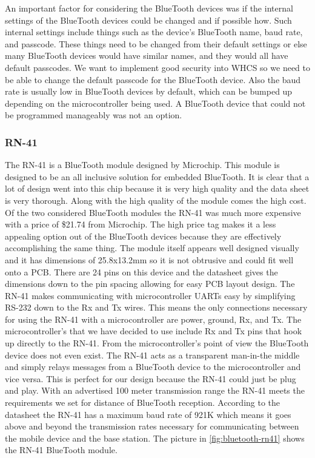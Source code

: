 An important factor for considering the BlueTooth devices was if the internal
settings of the BlueTooth devices could be changed and if possible how. Such
internal settings include things such as the device{}'s BlueTooth name, baud
rate, and passcode. These things need to be changed from their default settings
or else many BlueTooth devices would have similar names, and they would all
have default passcodes. We want to implement good security into WHCS so we need
to be able to change the default passcode for the BlueTooth device. Also the
baud rate is usually low in BlueTooth devices by default, which can be bumped
up depending on the microcontroller being used. A BlueTooth device that could
not be programmed manageably was not an option.

\subsubsection{RN-41}
The RN{}-41 is a BlueTooth module designed by Microchip. This module is
designed to be an all inclusive solution for embedded BlueTooth. It is clear
that a lot of design went into this chip because it is very high quality and
the data sheet is very thorough. Along with the high quality of the module
comes the high cost. Of the two considered BlueTooth modules the RN{}-41 was
much more expensive with a price of \$21.74 from Microchip. The high price tag
makes it a less appealing option out of the BlueTooth devices because they are
effectively accomplishing the same thing. The module itself appears well
designed visually and it has dimensions of 25.8x13.2mm so it is not obtrusive
and could fit well onto a PCB. There are 24 pins on this device and the
datasheet gives the dimensions down to the pin spacing allowing for easy PCB
layout design. The RN{}-41 makes communicating with microcontroller UARTs easy
by simplifying RS{}-232 down to the Rx and Tx wires. This means the only
connections necessary for using the RN{}-41 with a microcontroller are power,
ground, Rx, and Tx. The microcontroller{}'s that we have decided to use include
Rx and Tx pins that hook up directly to the RN{}-41. From the
microcontroller{}'s point of view the BlueTooth device does not even exist. The
RN{}-41 acts as a transparent man{}-in{}-the middle and simply relays messages
from a BlueTooth device to the microcontroller and vice versa. This is perfect
for our design because the RN{}-41 could just be plug and play. With an
advertised 100 meter transmission range the RN{}-41 meets the requirements we
set for distance of BlueTooth reception.  According to the datasheet the
RN{}-41 has a maximum baud rate of 921K which means it goes above and beyond
the transmission rates necessary for communicating between the mobile device
and the base station. The picture in \autoref{fig:bluetooth-rn41} shows the RN{}-41 BlueTooth
module.

